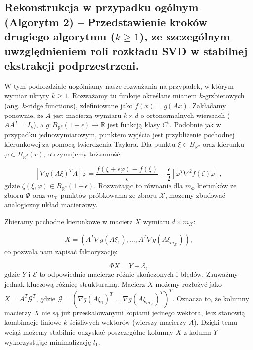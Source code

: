 \subsection{Rekonstrukcja w przypadku ogólnym (Algorytm 2) – Przedstawienie kroków drugiego algorytmu ($k \ge 1$), ze szczególnym uwzględnieniem roli rozkładu SVD w stabilnej ekstrakcji podprzestrzeni.}

    W tym podrozdziale uogólniamy nasze rozważania na przypadek, w którym wymiar ukryty $k \ge 1$. Rozważamy tu funkcje określane mianem $k$-grzbietowych (ang. $k$-ridge functions), zdefiniowane jako $f(x) = g(Ax)$.
Zakładamy ponownie, że $A$ jest macierzą wymiaru $k \times d$ o ortonormalnych wierszach ($AA^T = I_k$), a $g: B_{\mathbb{R}^k}(1+\bar{\epsilon}) \to \mathbb{R}$ jest funkcją klasy $C^2$.
Podobnie jak w przypadku jednowymiarowym, punktem wyjścia jest przybliżenie pochodnej kierunkowej za pomocą twierdzenia Taylora.
Dla punktu $\xi \in B_{\mathbb{R}^d}$ oraz kierunku $\varphi \in B_{\mathbb{R}^d}(r)$, otrzymujemy tożsamość:

$$[\nabla g(A\xi)^T A]\varphi = \frac{f(\xi+\epsilon\varphi) - f(\xi)}{\epsilon} - \frac{\epsilon}{2}[\varphi^T \nabla^2 f(\zeta) \varphi],$$
gdzie $\zeta(\xi,\varphi) \in B_{\mathbb{R}^d}(1+\bar{\epsilon})$.
Rozważając to równanie dla $m_\Phi$ kierunków ze zbioru $\Phi$ oraz $m_\mathcal{X}$ punktów próbkowania ze zbioru $\mathcal{X}$, możemy zbudować analogiczny układ macierzowy.

Zbieramy pochodne kierunkowe w macierz $X$ wymiaru $d \times m_\mathcal{X}$:

$$X = (A^T \nabla g(A\xi_1), \dots, A^T \nabla g(A\xi_{m_\mathcal{X}})),$$
co pozwala nam zapisać faktoryzację:

$$\Phi X = Y - \mathcal{E},$$
gdzie $Y$ i $\mathcal{E}$ to odpowiednio macierze różnic skończonych i błędów.
Zauważmy jednak kluczową różnicę strukturalną. Macierz $X$ możemy rozłożyć jako $X = A^T \mathcal{G}^T$, gdzie $\mathcal{G} = (\nabla g(A\xi_1)^T | \dots | \nabla g(A\xi_{m_\mathcal{X}})^T)^T$.
Oznacza to, że kolumny macierzy $X$ nie są już przeskalowanymi kopiami jednego wektora, lecz stanowią kombinacje liniowe $k$ ściśliwych wektorów (wierszy macierzy $A$). Dzięki temu wciąż możemy stabilnie odzyskać poszczególne kolumny $X$ z kolumn $Y$ wykorzystując minimalizację $l_1$.

